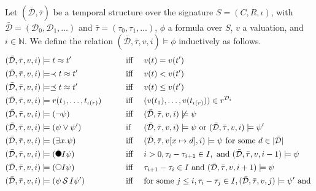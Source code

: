 \begin{definition}
    Let $(\bar{\mathcal{D}}, \bar{\tau})$ be a temporal structure over the signature $S = (C,R,\iota)$, with $\bar{\mathcal{D}} = (\mathcal{D}_0,\mathcal{D}_1,\dots)$ and $\bar{\tau} = (\tau_0, \tau_1, \dots)$, $\phi$ a formula over $S$, $v$ a valuation, and $i \in \mathbb{N}$.
    We define the relation $(\bar{\mathcal{D}},\bar{\tau},v,i) \models \phi$ inductively as follows.
    \begin{alignat*}{3}
        &(\bar{\mathcal{D}},\bar{\tau},v,i) \models t \approx t'  
            &&\text{iff } && v(t) = v(t') \\
        &(\bar{\mathcal{D}},\bar{\tau},v,i) \models \prec t \approx t'  
            &&\text{iff } && v(t) < v(t') \\
        &(\bar{\mathcal{D}},\bar{\tau},v,i) \models \preceq t \approx t'  
            &&\text{iff } && v(t) \leq v(t') \\
        &(\bar{\mathcal{D}},\bar{\tau},v,i) \models r(t_1,\dots,t_{\iota(r)})  
            \qquad
            &&\text{iff } && (v(t_1), \dots, v(t_{\iota(r)})) \in r^{\mathcal{D}_i} \\
        &(\bar{\mathcal{D}},\bar{\tau},v,i) \models (\neg \psi) 
            &&\text{iff } && (\bar{\mathcal{D}},\bar{\tau},v,i) \not\models \psi \\
        &(\bar{\mathcal{D}},\bar{\tau},v,i) \models (\psi \lor \psi') 
            &&\text{if } && (\bar{\mathcal{D}},\bar{\tau},v,i) \models \psi 
            \text{ or } (\bar{\mathcal{D}},\bar{\tau},v,i) \models \psi' \\
        &(\bar{\mathcal{D}},\bar{\tau},v,i) \models (\exists x. \psi) 
            &&\text{iff } && (\bar{\mathcal{D}},\bar{\tau},v[x \mapsto d],i) \models \psi 
            \text{ for some } d \in |\bar{\mathcal{D}}| \\
        &(\bar{\mathcal{D}},\bar{\tau},v,i) \models (\Previous{I} \psi) 
            &&\text{iff } && i > 0, \tau_i - \tau_{i+1} \in I, \text{ and } (\bar{\mathcal{D}}, \bar{\tau}, v, i-1) \models \psi \\
        &(\bar{\mathcal{D}},\bar{\tau},v,i) \models (\Next{I} \psi)
            &&\text{iff } && \tau_{i+1} - \tau_i \in I \text{ and } (\bar{\mathcal{D}},\bar{\tau},v,i+1) \models \psi \\
        &(\bar{\mathcal{D}},\bar{\tau},v,i) \models (\psi \Since{I} \psi')
            &&\text{iff} && \text{for some } j \leq i, \tau_i - \tau_j \in I, (\bar{\mathcal{D}}, \bar{\tau}, v, j) \models \psi' \text{ and } \\

\end{alignat*}
\end{definition}
